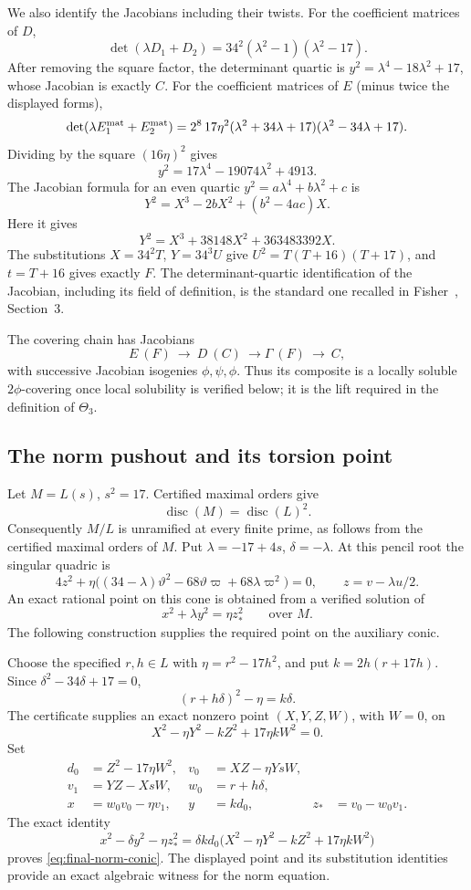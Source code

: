 \documentclass[11pt,a4paper]{article}
\theoremstyle{definition}\newtheorem{definition}[theorem]{Definition}
\theoremstyle{remark}\newtheorem{remark}[theorem]{Remark}
\begin{document}
We also identify the Jacobians including their twists.  For the
coefficient matrices of $D$,
\[
 \det(\lambda D_1+D_2)=34^2(\lambda^2-1)(\lambda^2-17).
\]
After removing the square factor, the determinant quartic is
$y^2=\lambda^4-18\lambda^2+17$, whose Jacobian is exactly $C$.
For the coefficient matrices of $E$ (minus twice the displayed forms),
\[
 \det(\lambda E_1^{\rm mat}+E_2^{\rm mat})
 =2^8\,17\eta^2(\lambda^2+34\lambda+17)
                     (\lambda^2-34\lambda+17).
\]
Dividing by the square $(16\eta)^2$ gives
\[
 y^2=17\lambda^4-19074\lambda^2+4913.
\]
The Jacobian formula for an even quartic
$y^2=a\lambda^4+b\lambda^2+c$ is
\[
 Y^2=X^3-2bX^2+(b^2-4ac)X.
\]
Here it gives
\[
 Y^2=X^3+38148X^2+363483392X.
\]
The substitutions $X=34^2T$, $Y=34^3U$ give
$U^2=T(T+16)(T+17)$, and $t=T+16$ gives exactly $F$.
The determinant-quartic identification of the Jacobian, including
its field of definition, is the standard one recalled in Fisher~\cite{Fisher4}, Section~3.

The covering chain has Jacobians
\[
 E\ (F)\ \longrightarrow\ D\ (C)\ \longrightarrow
 \Gamma\ (F)\ \longrightarrow\ C,
\]
with successive Jacobian isogenies $\phi,\psi,\phi$.
Thus its composite is a locally soluble $2\phi$-covering once local
solubility is verified below; it is the lift required in the definition
of $\Theta_3$.

\subsection{The norm pushout and its torsion point}

Let $M=L(s)$, $s^2=17$.  Certified maximal orders give
\[
 \operatorname{disc}(M)=\operatorname{disc}(L)^2.
\]
Consequently $M/L$ is unramified at every finite prime, as follows from the certified maximal orders of $M$. Put $\lambda=-17+4s$, $\delta=-\lambda$. At this pencil root the singular quadric is
\[
 4z^2+\eta\bigl((34-\lambda)\vartheta^2
             -68\vartheta\varpi+68\lambda\varpi^2\bigr)=0,
 \qquad z=v-\lambda u/2.
\]
An exact rational point on this cone is obtained from a verified
solution of
\begin{equation}\label{eq:final-norm-conic}
 x^2+\lambda y^2=\eta z_*^2 \qquad\text{over }M.
\end{equation}
The following construction supplies the required point on the auxiliary conic.

Choose the specified $r,h\in L$ with $\eta=r^2-17h^2$, and put
$k=2h(r+17h)$.  Since $\delta^2-34\delta+17=0$,
\[
 (r+h\delta)^2-\eta=k\delta.
\]
The certificate supplies an exact nonzero point $(X,Y,Z,W)$, with $W=0$,
on
\[
 X^2-\eta Y^2-kZ^2+17\eta kW^2=0.
\]
Set
\[
\begin{aligned}
 d_0&=Z^2-17\eta W^2,&v_0&=XZ-\eta YsW,\\
 v_1&=YZ-XsW,&w_0&=r+h\delta,\\
 x&=w_0v_0-\eta v_1,&y&=kd_0,&z_*&=v_0-w_0v_1.
\end{aligned}
\]
The exact identity
\[
 x^2-\delta y^2-\eta z_*^2
 =\delta k d_0\bigl(X^2-\eta Y^2-kZ^2+17\eta kW^2\bigr)
\]
proves \eqref{eq:final-norm-conic}. The displayed point and its substitution identities provide an exact algebraic witness for the norm equation.
\end{document}
